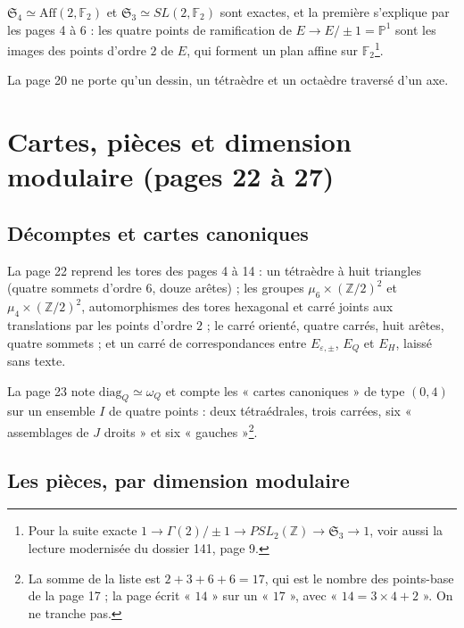 \documentclass[11pt,a4paper]{article}
\begin{document}
$\mathfrak{S}_4 \simeq \mathrm{Aff}(2, \mathbb{F}_2)$ et $\mathfrak{S}_3 \simeq
SL(2, \mathbb{F}_2)$ sont exactes, et la première s'explique par les pages 4 à
6 : les quatre points de ramification de $E \to E/\pm 1 = \mathbb{P}^{1}$ sont
les images des points d'ordre $2$ de $E$, qui forment un plan affine sur
$\mathbb{F}_2$\footnote{Pour la suite exacte $1 \to \Gamma(2)/\pm 1 \to
PSL_2(\mathbb{Z}) \to \mathfrak{S}_3 \to 1$, voir aussi la lecture modernisée du
dossier 141, page 9.}.

La page 20 ne porte qu'un dessin, un tétraèdre et un octaèdre traversé d'un
axe.

\section*{Cartes, pièces et dimension modulaire (pages 22 à 27)}

\subsection*{Décomptes et cartes canoniques}

La page 22 reprend les tores des pages 4 à 14 : un tétraèdre à huit triangles
(quatre sommets d'ordre $6$, douze arêtes) ; les groupes $\mu_6 \times
(\mathbb{Z}/2)^2$ et $\mu_4 \times (\mathbb{Z}/2)^2$, automorphismes des
tores hexagonal et carré joints aux translations par les points d'ordre $2$ ;
le carré orienté, quatre carrés, huit arêtes, quatre sommets ; et un carré de
correspondances entre $E_{\varepsilon,\pm}$, $E_Q$ et $E_H$, laissé sans texte.

La page 23 note $\mathrm{diag}_Q \simeq \omega_Q$ et compte les « cartes
canoniques » de type $(0,4)$ sur un ensemble $I$ de quatre points : deux
tétraédrales, trois carrées, six « assemblages de $J$ droits » et six
« gauches »\footnote{La somme de la liste est $2 + 3 + 6 + 6 = 17$, qui est le
nombre des points-base de la page 17 ; la page écrit « $14$ » sur un « $17$ »,
avec « $14 = 3 \times 4 + 2$ ». On ne tranche pas.}.

\subsection*{Les pièces, par dimension modulaire}
\end{document}
